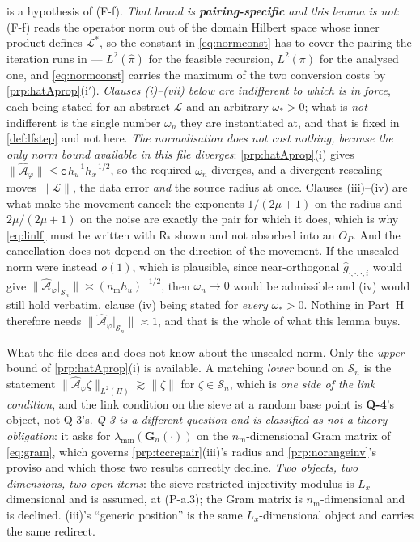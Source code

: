 \begin{lemma}
is a hypothesis of (F-f). \emph{That bound is \textbf{pairing-specific} and this lemma is not}: (F-f)
reads the operator norm out of the domain Hilbert space whose inner product defines
$\mathcal L^{\ast}$, so the constant in \eqref{eq:normconst} has to cover the pairing the iteration
runs in --- $L^{2}(\hat\pi)$ for the feasible recursion, $L^{2}(\pi)$ for the analysed one, and
\eqref{eq:normconst} carries the maximum of the two conversion costs by
\cref{prp:hatAprop}\textup{(i$'$)}. \emph{Clauses \textup{(i)}--\textup{(vii)} below are indifferent to
which is in force}, each being stated for an abstract $\mathcal L$ and an arbitrary $\omega_\ast>0$;
what is \emph{not} indifferent is the single number $\omega_n$ they are instantiated at, and that is
fixed in \cref{def:lfstep} and not here. \emph{The normalisation does not cost nothing, because the
only norm bound available in this file diverges}: \cref{prp:hatAprop}(i) gives
$\|\hat{\mathcal A}_\varphi\|\le\mathsf c\,h_u^{-1}h_x^{-1/2}$, so the required $\omega_n$ diverges,
and a divergent rescaling moves $\|\mathcal L\|$, the data error \emph{and} the source radius at once.
Clauses (iii)--(iv) are what make the movement cancel: the exponents $1/(2\mu+1)$ on the radius and
$2\mu/(2\mu+1)$ on the noise are exactly the pair for which it does, which is why \eqref{eq:linlf} must
be written with $\mathsf R_\ast$ shown and not absorbed into an $O_P$.
And the cancellation does not depend on the direction of the movement. If the unscaled norm were
instead $o(1)$, which is plausible, since near-orthogonal $\hat g_{\cdot,\cdot,\cdot,i}$ would give
$\|\hat{\mathcal A}_\varphi\vert_{\mathcal S_n}\|\asymp(n_{\mathrm m}h_u)^{-1/2}$, then
$\omega_n\to0$ would be admissible and (iv) would still hold verbatim, clause (iv) being stated for
\emph{every} $\omega_\ast>0$. Nothing in Part~H
therefore needs $\|\hat{\mathcal A}_\varphi\vert_{\mathcal S_n}\|\asymp1$, and that is the whole of what
this lemma buys.

What the file does and does not know about the unscaled norm. Only the \emph{upper} bound of
\cref{prp:hatAprop}(i) is
available. A matching \emph{lower} bound on $\mathcal S_n$ is the statement
$\|\hat{\mathcal A}_\varphi\zeta\|_{L^{2}(\Pi)}\gtrsim\|\zeta\|$ for $\zeta\in\mathcal S_n$, which is
\emph{one side of the link condition}, and the link condition on the sieve at a random base point is
\textbf{Q-4}'s object, not Q-3's. \emph{Q-3 is a different question and is classified as not a theory
obligation}: it asks for $\lambda_{\min}(\mathbf G_n(\cdot))$ on the $n_{\mathrm m}$-dimensional Gram
matrix of \eqref{eq:gram}, which governs \cref{prp:tccrepair}(iii)'s radius and
\cref{prp:norangeinv}'s proviso and which those two results correctly decline. \emph{Two objects, two
dimensions, two open items}: the sieve-restricted
injectivity modulus is $L_x$-dimensional and is assumed, at (P-a.3); the Gram matrix is
$n_{\mathrm m}$-dimensional and is declined. (iii)'s ``generic position'' is the
same $L_x$-dimensional object and carries the same redirect.


\end{lemma}
